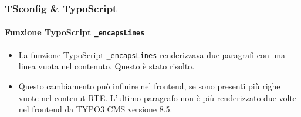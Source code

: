 \begin{frame}[fragile]
	\frametitle{TSconfig \& TypoScript}
	\framesubtitle{Funzione TypoScript \texttt{\_encapsLines}}

	\begin{itemize}
		\item La funzione TypoScript \texttt{\_encapsLines} renderizzava due paragrafi con una
			linea vuota nel contenuto. Questo è stato risolto.

		\item Questo cambiamento può influire nel frontend, se sono presenti più righe vuote 
			nel contenut RTE. L'ultimo paragrafo non è più renderizzato due volte
			nel frontend da TYPO3 CMS versione 8.5.

	\end{itemize}

\end{frame}

